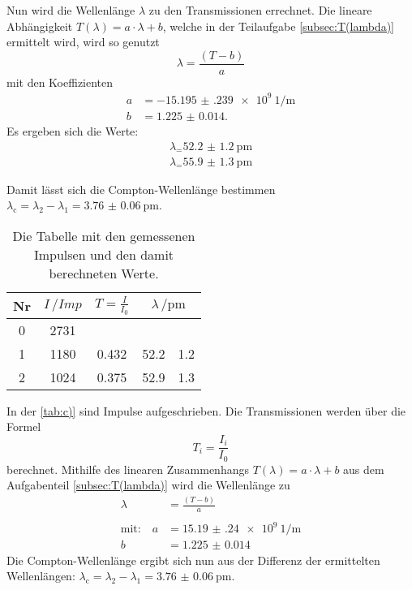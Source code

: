   \noindent Nun wird die Wellenlänge $\lambda$ zu den Transmissionen errechnet. Die lineare Abhängigkeit $T(\lambda) = a \cdot \lambda + b $, 
  welche in der Teilaufgabe \ref{subsec:T(lambda)} ermittelt wird, wird so genutzt
  \begin{equation*}
    \lambda = \frac{(T - b)}{a}
  \end{equation*}
  mit den Koeffizienten
  \begin{align*}
    a &= \SI{-15.195(239)e9}{1\per\metre}\\
    b &= \num{1.225(14)}.
  \end{align*}
  Es ergeben sich die Werte:
  \begin{align*}
    \lambda_ = \SI{52.2(12)}{\pico\metre}\\
    \lambda_ = \SI{55.9(13)}{\pico\metre}
  \end{align*}

  \noindent Damit lässt sich die Compton-Wellenlänge bestimmen $\lambda_{\text{c}} = \lambda_2 - \lambda_1 = \SI{3.76(6)}{\pico\metre}$. 

  \begin{table}
    \centering
    \caption{Die Tabelle mit den gemessenen Impulsen und den damit berechneten Werte.}
    \label{tab:c)}
    \begin{tabular}{c c c c @{${}\pm{}$} c}
      \toprule
      Nr & $ I \, / \si{Imp}$ & $ T = \frac{I}{I_0}$ & \multicolumn{2}{c}{$ \lambda \, / \si{\pico\metre}$} \\
      \midrule
      0 & 2731  &          &     &     \\
      1 & 1180  &  0.432   & 52.2&1.2  \\
      2 & 1024  &  0.375   & 52.9&1.3  \\
      \bottomrule
    \end{tabular}
  \end{table}

  \noindent In der \autoref{tab:c)} sind Impulse aufgeschrieben. Die Transmissionen werden über die Formel
  \begin{equation*}
    T_i = \frac{I_i}{I_0}
  \end{equation*}
  berechnet. Mithilfe des linearen Zusammenhangs $T(\lambda) = a \cdot \lambda + b $ aus dem Aufgabenteil \ref{subsec:T(lambda)} wird die Wellenlänge zu 
  \begin{align*}
    \lambda &= \frac{(T - b)}{a}\\
    \\
    \text{mit:} \quad     a &= \SI{15.19(24)e9}{1\per\metre}\\
                          b &= \num{1.225(14)}
  \end{align*} 
  Die Compton-Wellenlänge ergibt sich nun aus der Differenz der ermittelten Wellenlängen: $\lambda_{\text{c}} = \lambda_2 - \lambda_1 = \SI{3.76(6)}{\pico\metre}$. 